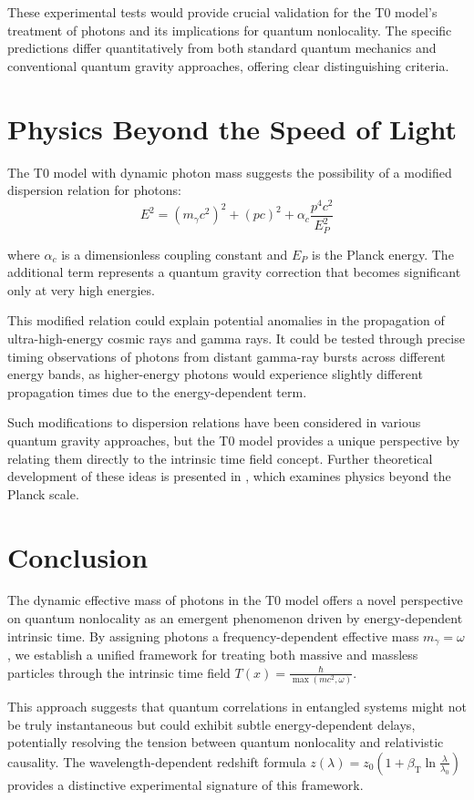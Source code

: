 \documentclass[12pt,a4paper]{article}
\newcommand{\Tfield}{T(x)}
\newcommand{\betaT}{\beta_{\text{T}}}
\begin{document}
	These experimental tests would provide crucial validation for the T0 model's treatment of photons and its implications for quantum nonlocality. The specific predictions differ quantitatively from both standard quantum mechanics and conventional quantum gravity approaches, offering clear distinguishing criteria.
	
	\section{Physics Beyond the Speed of Light}
	The T0 model with dynamic photon mass suggests the possibility of a modified dispersion relation for photons:
	\begin{equation}
		E^2 = (m_\gamma c^2)^2 + (p c)^2 + \alpha_c \frac{p^4 c^2}{E_P^2}
	\end{equation}
	
	where \(\alpha_c\) is a dimensionless coupling constant and \(E_P\) is the Planck energy. The additional term represents a quantum gravity correction that becomes significant only at very high energies.
	
	This modified relation could explain potential anomalies in the propagation of ultra-high-energy cosmic rays and gamma rays. It could be tested through precise timing observations of photons from distant gamma-ray bursts across different energy bands, as higher-energy photons would experience slightly different propagation times due to the energy-dependent term.
	
	Such modifications to dispersion relations have been considered in various quantum gravity approaches, but the T0 model provides a unique perspective by relating them directly to the intrinsic time field concept. Further theoretical development of these ideas is presented in \cite{pascher_planck_2025}, which examines physics beyond the Planck scale.
	
	\section{Conclusion}
	The dynamic effective mass of photons in the T0 model offers a novel perspective on quantum nonlocality as an emergent phenomenon driven by energy-dependent intrinsic time. By assigning photons a frequency-dependent effective mass \(m_\gamma = \omega\), we establish a unified framework for treating both massive and massless particles through the intrinsic time field \(\Tfield = \frac{\hbar}{\max(m c^2, \omega)}\).
	
	This approach suggests that quantum correlations in entangled systems might not be truly instantaneous but could exhibit subtle energy-dependent delays, potentially resolving the tension between quantum nonlocality and relativistic causality. The wavelength-dependent redshift formula \(z(\lambda) = z_0 \left(1 + \betaT \ln\frac{\lambda}{\lambda_0}\right)\) provides a distinctive experimental signature of this framework.
	
\end{document}
